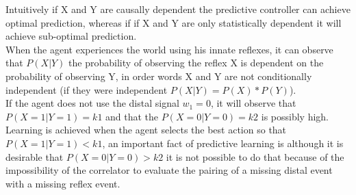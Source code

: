 Intuitively if X and Y are causally dependent the predictive controller can achieve optimal 
prediction, whereas if if X and Y are only statistically dependent it will achieve sub-optimal prediction.\\
When the agent experiences the world using his innate reflexes, it can observe that $P(X|Y)$ 
the probability of observing the reflex X is dependent on the probability of observing Y, 
in order words X and Y are not conditionally independent (if they were independent $P(X|Y)=P(X)*P(Y)$).\\
If the agent does not use the distal signal $w_1=0$, it will observe that $P(X=1|Y=1)=k1$ and 
that the $P(X=0|Y=0)=k2$ is possibly high. Learning is achieved when the agent selects the best 
action so that $P(X=1|Y=1)<k1$, an important fact of predictive learning is although it is 
desirable that $P(X=0|Y=0)>k2$ it is not possible to do that because of the impossibility of 
the correlator to evaluate the pairing of a missing distal event with a missing reflex event.\\

